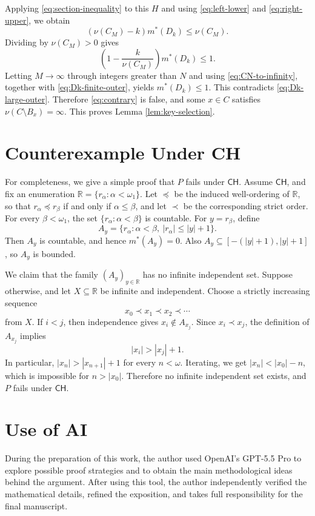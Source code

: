 \documentclass{amsart}
\theoremstyle{plain}
\theoremstyle{definition}
\newcommand{\R}{\mathbb{R}}
\newcommand{\CH}{\mathsf{CH}}
\begin{document}
Applying \eqref{eq:section-inequality} to this $H$ and using \eqref{eq:left-lower} and \eqref{eq:right-upper}, we obtain
\[
(\nu(C_M)-k)m^*(D_k)
\le
\nu(C_M).
\]
Dividing by $\nu(C_M)>0$ gives
\[
\left(1-\frac{k}{\nu(C_M)}\right)m^*(D_k)
\le
1.
\]
Letting $M\to\infty$ through integers greater than $N$ and using \eqref{eq:CN-to-infinity}, together with \eqref{eq:Dk-finite-outer}, yields $m^*(D_k)\le1$.
This contradicts \eqref{eq:Dk-large-outer}.
Therefore \eqref{eq:contrary} is false, and some $x\in C$ satisfies $\nu(C\setminus B_x)=\infty$.
This proves Lemma \ref{lem:key-selection}.

\appendix

\section{Counterexample Under CH}\label{sec:ch-counterexample}

For completeness, we give a simple proof that $P$ fails under $\CH$.
Assume $\CH$, and fix an enumeration $\R=\{r_\alpha:\alpha<\omega_1\}$.
Let $\preceq$ be the induced well-ordering of $\R$, so that $r_\alpha\preceq r_\beta$ if and only if $\alpha\le\beta$, and let $\prec$ be the corresponding strict order.
For every $\beta<\omega_1$, the set $\{r_\alpha:\alpha<\beta\}$ is countable.
For $y=r_\beta$, define
\[
A_y
=
\{r_\alpha:\alpha<\beta,\ |r_\alpha|\le |y|+1\}.
\]
Then $A_y$ is countable, and hence $m^*(A_y)=0$.
Also $A_y\subseteq[-(|y|+1),|y|+1]$, so $A_y$ is bounded.

We claim that the family $(A_y)_{y\in\R}$ has no infinite independent set.
Suppose otherwise, and let $X\subseteq\R$ be infinite and independent.
Choose a strictly increasing sequence
\[
x_0\prec x_1\prec x_2\prec\cdots
\]
from $X$.
If $i<j$, then independence gives $x_i\notin A_{x_j}$.
Since $x_i\prec x_j$, the definition of $A_{x_j}$ implies
\[
|x_i|>|x_j|+1.
\]
In particular, $|x_n|>|x_{n+1}|+1$ for every $n<\omega$.
Iterating, we get $|x_n|<|x_0|-n$, which is impossible for $n>|x_0|$.
Therefore no infinite independent set exists, and $P$ fails under $\CH$.

\section*{Use of AI}

During the preparation of this work, the author used OpenAI's GPT-5.5 Pro to explore possible proof strategies and to obtain the main methodological ideas behind the argument.
After using this tool, the author independently verified the mathematical details, refined the exposition, and takes full responsibility for the final manuscript.
\end{document}
